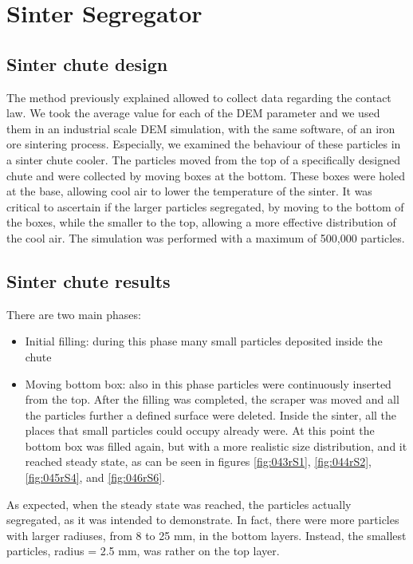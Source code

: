 
\chapter{Sinter Segregator}
\label{cap:sintersegregator}

\section{Sinter chute design}
\label{sec:sinterchutedesign}

The method previously explained allowed to collect data regarding the contact
law. We took the average value for each of the DEM parameter and we used them 
in an industrial scale DEM simulation, with the same software, 
of an iron ore sintering process. 
Especially, we examined the behaviour of these particles in a sinter chute cooler. 
The particles moved from the top of a specifically designed chute and were 
collected by moving boxes at the bottom. These boxes were holed at the base, 
allowing cool air to lower the temperature of the sinter. 
It was critical to ascertain if the larger particles segregated, 
by moving to the bottom of the boxes, while the smaller to the top, allowing a 
more effective distribution of the cool air. The simulation was performed 
with a maximum of 500,000 particles.

\section{Sinter chute results}
\label{sec:sinterchuteresults}


There are two main phases:
\begin{itemize}
  \item{Initial filling: during this phase many small particles deposited inside
  the chute}
  \item{Moving bottom box: also in this phase particles were
continuously inserted from the top. After the filling was completed, the
scraper was moved and all the particles further a defined surface were
deleted. Inside the sinter, all the places that small particles could
occupy already were. At this point the bottom box was filled again, but
with a more realistic size distribution, and it reached steady state, as can
be seen in figures \ref{fig:043rS1}, \ref{fig:044rS2}, \ref{fig:045rS4}, and
\ref{fig:046rS6}.}
\end{itemize}
As expected, when the steady state was reached, the particles actually
segregated, as it was intended to demonstrate.
In fact, there were more particles with larger radiuses, from 8 to 25 mm, in the
bottom layers.
Instead, the smallest particles, radius = 2.5 mm, was rather on the top layer. 


